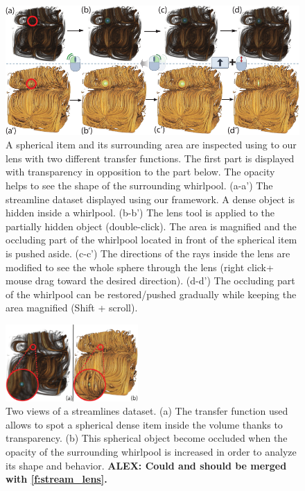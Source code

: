 \begin{figure}[htb]
\includegraphics [width=\textwidth]{images/stream_lens.pdf}
\caption{A spherical item and its surrounding area are inspected using to our lens with two different transfer functions. The first part is displayed with transparency in opposition to the part below. The opacity helps to see the shape of the surrounding whirlpool. (a-a') The streamline dataset displayed using our framework. A dense object is hidden inside a whirlpool. (b-b') The lens tool is applied to the partially hidden object (double-click). The area is magnified and the occluding part of the whirlpool located in front of the spherical item is pushed aside. (c-c') The directions of the rays inside the lens are modified to see the whole sphere through the lens (right click+ mouse drag toward the desired direction). (d-d') The occluding part of the whirlpool can be restored/pushed gradually while keeping the area magnified (Shift + scroll).  }
\label{f:stream_lens}
\end{figure}

\begin{figure}[htb]
\includegraphics [width=0.45\textwidth]{images/streamline_orientation.pdf}
\caption{Two views of a streamlines dataset. (a) The transfer function used allows to spot a spherical dense item inside the volume thanks to transparency. (b) This spherical object become occluded when the opacity of the surrounding whirlpool is increased in order to analyze its shape and behavior. \textbf{ALEX: Could and should be merged with \autoref{f:stream_lens}.}}
\label{f:streamLineSTDViz}
\end{figure}


